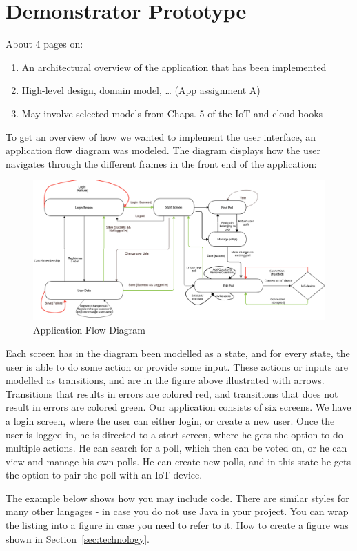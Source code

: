 \section{Demonstrator Prototype}
\label{sec:design}

About 4 pages on:

\begin{enumerate}

\item An architectural overview of the application that has been implemented
\item High-level design, domain model, … (App assignment A)
\item May involve selected models from Chaps. 5 of the IoT and cloud books


\end{enumerate}

To get an overview of how we wanted to implement the user interface, an application flow diagram was modeled. 
The diagram displays how the user navigates through the different frames in the front end of the application:
\begin{figure}
  \centering
  \includegraphics[scale=0.30]{figs/Application Flow Diagram (1).png}
  \caption{Application Flow Diagram}
  \label{fig:appFlow}
\end{figure}

Each screen has in the diagram been modelled as a state, and for every state, the user is able to do some action or provide some input. 
These actions or inputs are modelled as transitions, and are in the figure above illustrated with arrows. Transitions that results in errors are 
colored red, and transitions that does not result in errors are colored green. Our application consists of six screens. We have a login screen, 
where the user can either login, or create a new user. Once the user is logged in, he is directed to a start screen, where he gets the option to 
do multiple actions. He can search for a poll, which then can be voted on, or he can view and manage his own polls. He can create new polls,
and in this state he gets the option to pair the poll with an IoT device. 

The example below shows how you may include code. There are similar
styles for many other langages - in case you do not use Java in your
project. You can wrap the listing into a figure in case you need to
refer to it. How to create a figure was shown in Section~\ref{sec:technology}.


